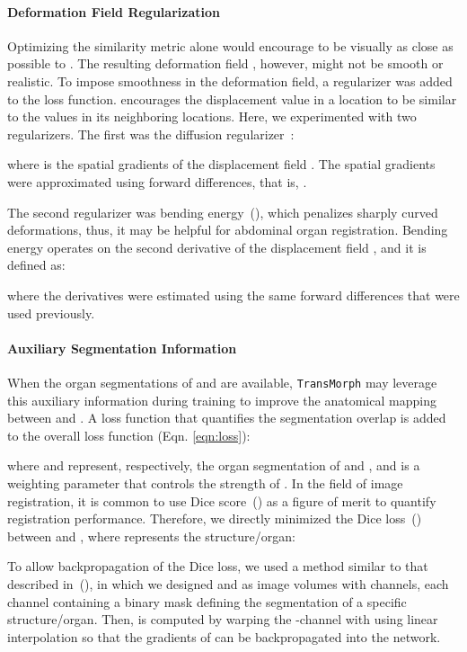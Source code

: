 \documentclass[times,twocolumn,final]{elsarticle}
\begin{document}
\paragraph{Deformation Field Regularization} Optimizing the similarity metric alone would encourage  to be visually as close as possible to . The resulting deformation field , however, might not be smooth or realistic. To impose smoothness in the deformation field, a regularizer  was added to the loss function.  encourages the displacement value in a location to be similar to the values in its neighboring locations. Here, we experimented with two regularizers. The first was the diffusion regularizer~\cite{balakrishnan2019voxelmorph}:
\begin{linenomath}

\end{linenomath}
where  is the spatial gradients of the displacement field . The spatial gradients were approximated using forward differences, that is, .

The second regularizer was bending energy~(\cite{rueckert1999nonrigid}), which penalizes sharply curved deformations, thus, it may be helpful for abdominal organ registration. Bending energy operates on the second derivative of the displacement field , and it is defined as:
\begin{linenomath}

\end{linenomath}
where the derivatives were estimated using the same forward differences that were used previously.

\paragraph{Auxiliary Segmentation Information}
\label{sec:aux_seg}
When the organ segmentations of  and  are available, \texttt{TransMorph} may leverage this auxiliary information during training to improve the anatomical mapping between  and . A loss function  that quantifies the segmentation overlap is added to the overall loss function (Eqn. \ref{eqn:loss}): 
\begin{linenomath}

\end{linenomath}
where  and  represent, respectively, the organ segmentation of  and , and  is a weighting parameter that controls the strength of . In the field of image registration, it is common to use Dice score~(\cite{dice1945measures}) as a figure of merit to quantify registration performance. Therefore, we directly minimized the Dice loss~(\cite{milletari2016v}) between  and , where  represents the  structure/organ:
\begin{linenomath}

\end{linenomath}
To allow backpropagation of the Dice loss, we used a method similar to that described in~(\cite{balakrishnan2019voxelmorph}), in which we designed  and  as image volumes with  channels, each channel containing a binary mask defining the segmentation of a specific structure/organ. Then,  is computed by warping the -channel  with  using linear interpolation so that the gradients of  can be backpropagated into the network. 
\end{document}
